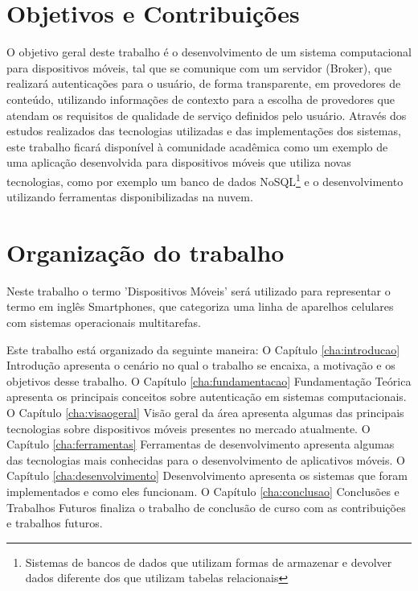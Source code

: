 \section{Objetivos e Contribuições}
O objetivo geral deste trabalho é o desenvolvimento de um sistema computacional para dispositivos móveis, tal que se comunique com um servidor (Broker), que realizará autenticações para o usuário, de forma transparente, em provedores de conteúdo, utilizando informações de contexto para a escolha de provedores que atendam os requisitos de qualidade de serviço definidos pelo usuário.
Através dos estudos realizados das tecnologias utilizadas e das implementações dos sistemas, este trabalho ficará disponível à comunidade acadêmica como um exemplo de uma aplicação desenvolvida para dispositivos móveis que utiliza novas tecnologias, como por exemplo um banco de dados NoSQL\footnote{Sistemas de bancos de dados que utilizam formas de armazenar e devolver dados diferente dos que utilizam tabelas relacionais} e o desenvolvimento utilizando ferramentas disponibilizadas na nuvem.

\section{Organização do trabalho}
Neste trabalho o termo 'Dispositivos Móveis' será utilizado para representar o termo em inglês Smartphones, que categoriza uma linha de aparelhos celulares com sistemas operacionais multitarefas.

Este trabalho está organizado da seguinte maneira: O Capítulo \ref{cha:introducao} Introdução apresenta o cenário no qual o trabalho se encaixa, a motivação e os objetivos desse trabalho. O Capítulo \ref{cha:fundamentacao} Fundamentação Teórica  apresenta os principais conceitos sobre autenticação em sistemas computacionais. O Capítulo \ref{cha:visaogeral} Visão geral da área apresenta algumas das principais tecnologias sobre dispositivos móveis presentes no mercado atualmente. O Capítulo \ref{cha:ferramentas} Ferramentas de desenvolvimento apresenta algumas das tecnologias mais conhecidas para o desenvolvimento de aplicativos móveis. O Capítulo \ref{cha:desenvolvimento} Desenvolvimento apresenta os sistemas que foram implementados e como eles funcionam. O Capítulo \ref{cha:conclusao} Conclusões e Trabalhos Futuros finaliza o trabalho de conclusão de curso com as contribuições e trabalhos futuros.